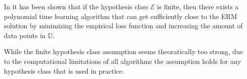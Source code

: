 In \cite{AgnosticPAC} it has been shown that if the hypothesis class $\mathcal{E}$ is finite, 
then there exists a polynomial time learning algorithm
that can get sufficiently close to the ERM solution by minimizing the empirical loss function
and increasing the amount of data points in $\mathbb{D}$.

While the finite hypothesis class assumption seems theoratically too strong,
due to the computational limitations of all algorithms
the assumption holds for any hypothesis class that is used in practice.
